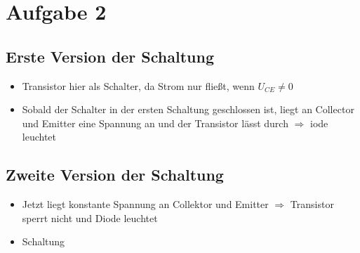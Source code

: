 \documentclass[compress,11pt]{beamer}
\begin{document}
\section{Aufgabe 2}
\begin{frame}
\subsection{Erste Version der Schaltung}
\begin{itemize}
\item Transistor hier als Schalter, da Strom nur fließt, wenn $U_{CE} \neq 0$
\item Sobald der Schalter in der ersten Schaltung geschlossen ist, liegt an Collector und Emitter eine Spannung an und der Transistor lässt durch $\Rightarrow$ iode leuchtet
\end{itemize}
\subsection{Zweite Version der Schaltung}
\begin{itemize}
\item Jetzt liegt konstante Spannung an Collektor und Emitter $\Rightarrow$ Transistor sperrt nicht und Diode leuchtet
\item Schaltung
\end{itemize}
\end{frame}
\end{document}
